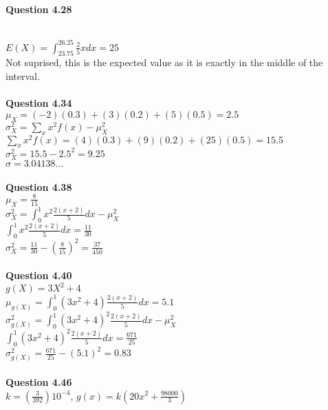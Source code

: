 \documentclass{article}
\begin{document}
    \textbf{Question 4.28}\\
        \\
        $E(X) = \int_{23.75}^{26.25}\frac{2}{5}xdx = 25$\\
        Not suprised, this is the expected value as it is exactly in the middle of the interval.\\\\
    \textbf{Question 4.34}\\
        $\mu_X = (-2)(0.3)+(3)(0.2)+(5)(0.5) = 2.5$\\
        $\sigma_X^2 = \sum_{x}x^2f(x)-\mu_X^2$\\
        $\sum_{x}x^2f(x) = (4)(0.3) + (9)(0.2) + (25)(0.5) = 15.5$\\
        $\sigma_X^2 =15.5 - 2.5^2 = 9.25$\\
        $\sigma = 3.04138...$
        \\\\
    \textbf{Question 4.38}\\
        $\mu_X = \frac{8}{15}$\\
        $\sigma_X^2 = \int_{0}^{1}x^2\frac{2(x+2)}{5}dx-\mu_X^2$\\
        $\int_{0}^{1}x^2\frac{2(x+2)}{5}dx = \frac{11}{30}$\\
        $\sigma_X^2=\frac{11}{30} - (\frac{8}{15})^2 = \frac{37}{450}$
        \\\\
    \textbf{Question 4.40}\\
        $g(X) = 3X^2+4$\\
        $\mu_{g(X)} = \int_{0}^{1}(3x^2+4)\frac{2(x+2)}{5}dx = 5.1$\\
        $\sigma_{g(X)}^2 = \int_{0}^{1}(3x^2+4)^2\frac{2(x+2)}{5}dx-\mu_X^2$\\
        $\int_{0}^{1}(3x^2+4)^2\frac{2(x+2)}{5}dx = \frac{671}{25}$\\
        $\sigma_{g(X)}^2 = \frac{671}{25} - (5.1)^2 = 0.83$
        \\\\
    \textbf{Question 4.46}\\
        $k = (\frac{3}{392})10^{-4}$, $g(x) = k(20x^2+\frac{98000}{3})$\\
\end{document}
